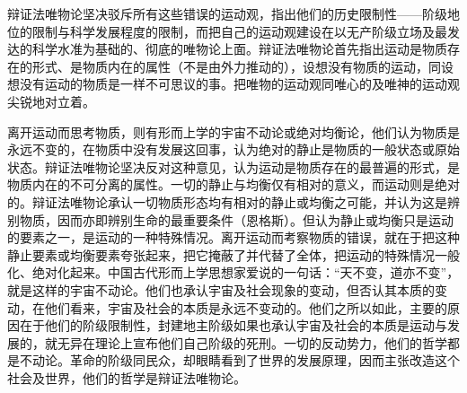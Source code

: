 \documentclass[UTF8, 12pt, a4paper]{ctexrep}
\begin{document}
辩证法唯物论坚决驳斥所有这些错误的运动观，指出他们的历史限制性——阶级地位的限制与科学发展程度的限制，而把自己的运动观建设在以无产阶级立场及最发达的科学水准为基础的、彻底的唯物论上面。辩证法唯物论首先指出运动是物质存在的形式、是物质内在的属性（不是由外力推动的），设想没有物质的运动，同设想没有运动的物质是一样不可思议的事。把唯物的运动观同唯心的及唯神的运动观尖锐地对立着。

离开运动而思考物质，则有形而上学的宇宙不动论或绝对均衡论，他们认为物质是永远不变的，在物质中没有发展这回事，认为绝对的静止是物质的一般状态或原始状态。辩证法唯物论坚决反对这种意见，认为运动是物质存在的最普遍的形式，是物质内在的不可分离的属性。一切的静止与均衡仅有相对的意义，而运动则是绝对的。辩证法唯物论承认一切物质形态均有相对的静止或均衡之可能，并认为这是辨别物质，因而亦即辨别生命的最重要条件（恩格斯）。但认为静止或均衡只是运动的要素之一，是运动的一种特殊情况。离开运动而考察物质的错误，就在于把这种静止要素或均衡要素夸张起来，把它掩蔽了并代替了全体，把运动的特殊情况一般化、绝对化起来。中国古代形而上学思想家爱说的一句话：“天不变，道亦不变”，就是这样的宇宙不动论。他们也承认宇宙及社会现象的变动，但否认其本质的变动，在他们看来，宇宙及社会的本质是永远不变动的。他们之所以如此，主要的原因在于他们的阶级限制性，封建地主阶级如果也承认宇宙及社会的本质是运动与发展的，就无异在理论上宣布他们自己阶级的死刑。一切的反动势力，他们的哲学都是不动论。革命的阶级同民众，却眼睛看到了世界的发展原理，因而主张改造这个社会及世界，他们的哲学是辩证法唯物论。
\end{document}
